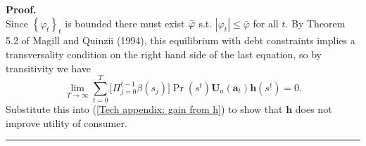 \documentclass[thmsb,11pt]{article}
\newenvironment{proof}[1][Proof]{\noindent \textbf{#1.} }{\  \rule{0.5em}{0.5em}}
\begin{document}
\begin{proof}
\begin{equation*}
\end{equation*}%
Since $\left\{ \varphi _{t}\right\} _{t}$ is bounded there must exist $\bar{%
\varphi}$ s.t. $|\varphi _{t}|\leq \bar{\varphi}$ for all $t$. By Theorem
5.2 of Magill and Quinzii (1994), this equilibrium with debt constraints
implies a transversality condition on the right hand side of the last
equation, so by transitivity we have%
\begin{equation*}
\lim_{T\rightarrow \infty }\sum_{t=0}^{T}\bigl[\Pi_{j=0}^{t-1} \beta(s_j)\bigr]\Pr \left( s^{t}\right)
\mathbf{U}_{a}(\mathbf{a}_{t})\mathbf{h}\left( s^{t}\right) =0.
\end{equation*}%
Substitute this into (\ref{Tech appendix: gain from h}) to show that $%
\mathbf{h}$ does not improve utility of consumer.
\end{proof}
\end{document}
